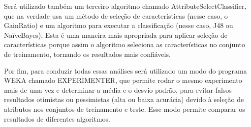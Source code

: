 Será utilizado também um terceiro algoritmo chamado AttributeSelectClassifier, que na verdade usa um método de seleção de características (nesse caso, o GainRatio) e um algoritmo para executar a classificação (nesse caso, J48 ou NaïveBayes). Esta é uma maneira mais apropriada para aplicar seleção de características porque assim o algoritmo seleciona as características no conjunto de treinamento, tornando os resultados mais confiáveis.

Por fim, para conduzir todas essas análises será utilizado um modo do programa WEKA chamado EXPERIMENTER, que permite rodar o mesmo experimento mais de uma vez e determinar a média e o desvio padrão, para evitar falsos resultados otimistas ou pessimistas (alta ou baixa acurácia) devido à seleção de atributos nos conjuntos de treinamento e teste. Esse modo permite comparar os resultados de diferentes algoritmos.






















